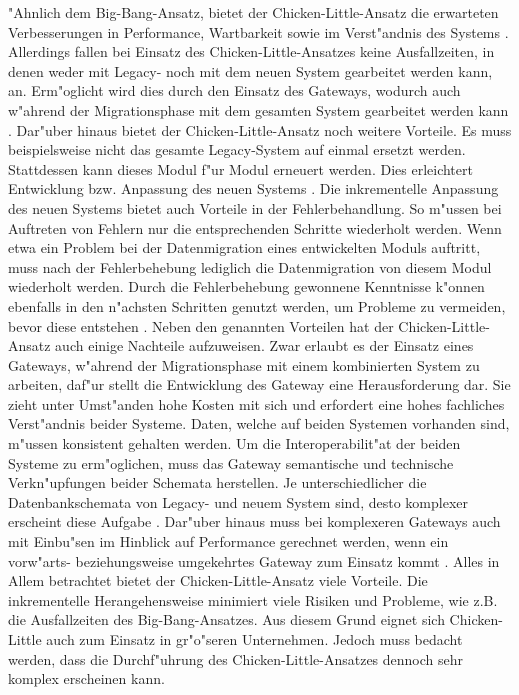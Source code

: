 \lb
"Ahnlich dem Big-Bang-Ansatz, bietet der Chicken-Little-Ansatz die erwarteten Verbesserungen in Performance, Wartbarkeit sowie im Verst"andnis des Systems \citep[S.~108]{bisbal-1999}. Allerdings fallen bei Einsatz des Chicken-Little-Ansatzes keine Ausfallzeiten, in denen weder mit Legacy- noch mit dem neuen System gearbeitet werden kann, an. Erm"oglicht wird dies durch den Einsatz des Gateways, wodurch auch w"ahrend der Migrationsphase mit dem gesamten System gearbeitet werden kann \citep[S.~2]{wuLawless-1997}. Dar"uber hinaus bietet der Chicken-Little-Ansatz noch weitere Vorteile. Es muss beispielsweise nicht das gesamte Legacy-System auf einmal ersetzt werden. Stattdessen kann dieses Modul f"ur Modul erneuert werden. Dies erleichtert Entwicklung bzw. Anpassung des neuen Systems \citep[S.~3]{brodie-1993}. Die inkrementelle Anpassung des neuen Systems bietet auch Vorteile in der Fehlerbehandlung. So m"ussen bei Auftreten von Fehlern nur die entsprechenden Schritte wiederholt werden. Wenn etwa ein Problem bei der Datenmigration eines entwickelten Moduls auftritt, muss nach der Fehlerbehebung lediglich die Datenmigration von diesem Modul wiederholt werden. Durch die Fehlerbehebung gewonnene Kenntnisse k"onnen ebenfalls in den n"achsten Schritten genutzt werden, um Probleme zu vermeiden, bevor diese entstehen \citep[S.~3]{brodie-1993}.
\lb
Neben den genannten Vorteilen hat der Chicken-Little-Ansatz auch einige Nachteile aufzuweisen. Zwar erlaubt es der Einsatz eines Gateways, w"ahrend der Migrationsphase mit einem kombinierten System zu arbeiten, daf"ur stellt die Entwicklung des Gateway eine Herausforderung dar. Sie zieht unter Umst"anden hohe Kosten mit sich und erfordert eine hohes fachliches Verst"andnis beider Systeme. Daten, welche auf beiden Systemen vorhanden sind, m"ussen konsistent gehalten werden. Um die Interoperabilit"at der beiden Systeme zu erm"oglichen, muss das Gateway semantische und technische Verkn"upfungen beider Schemata herstellen. Je unterschiedlicher die Datenbankschemata von Legacy- und neuem System sind, desto komplexer erscheint diese Aufgabe \citep[S.~2f.]{wuLawless-1997}. Dar"uber hinaus muss bei komplexeren Gateways auch mit Einbu"sen im Hinblick auf Performance gerechnet werden, wenn ein vorw"arts- beziehungsweise umgekehrtes Gateway zum Einsatz kommt \citep[S.~109]{bisbal-1999}.
\lb
Alles in Allem betrachtet bietet der Chicken-Little-Ansatz viele Vorteile. Die inkrementelle Herangehensweise minimiert viele Risiken und Probleme, wie z.B. die Ausfallzeiten des Big-Bang-Ansatzes. Aus diesem Grund eignet sich Chicken-Little auch zum Einsatz in gr"o"seren Unternehmen. Jedoch muss bedacht werden, dass die Durchf"uhrung des Chicken-Little-Ansatzes dennoch sehr komplex erscheinen kann.

